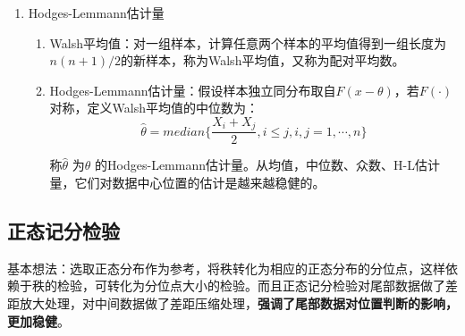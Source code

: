 \documentclass[
]{book}
\newenvironment{Shaded}{\begin{snugshade}}{\end{snugshade}}
\newcommand{\AttributeTok}[1]{\textcolor[rgb]{0.13,0.29,0.53}{#1}}
\newcommand{\CommentTok}[1]{\textcolor[rgb]{0.56,0.35,0.01}{\textit{#1}}}
\newcommand{\DecValTok}[1]{\textcolor[rgb]{0.00,0.00,0.81}{#1}}
\newcommand{\FunctionTok}[1]{\textcolor[rgb]{0.13,0.29,0.53}{\textbf{#1}}}
\newcommand{\NormalTok}[1]{#1}
\newcommand{\OtherTok}[1]{\textcolor[rgb]{0.56,0.35,0.01}{#1}}
\newcommand{\StringTok}[1]{\textcolor[rgb]{0.31,0.60,0.02}{#1}}
\begin{document}
\begin{enumerate}
  在R中，使用\texttt{wilcox.test()}函数进行Wilcoxon符号秩检验：

\begin{Shaded}
\begin{Highlighting}[]
\CommentTok{\# 单样本Wilcoxon符号秩检验}
\NormalTok{x }\OtherTok{\textless{}{-}} \FunctionTok{c}\NormalTok{(}\DecValTok{36}\NormalTok{, }\DecValTok{32}\NormalTok{, }\DecValTok{31}\NormalTok{, }\DecValTok{25}\NormalTok{, }\DecValTok{28}\NormalTok{, }\DecValTok{36}\NormalTok{, }\DecValTok{40}\NormalTok{, }\DecValTok{32}\NormalTok{, }\DecValTok{41}\NormalTok{, }\DecValTok{26}\NormalTok{, }\DecValTok{35}\NormalTok{, }\DecValTok{35}\NormalTok{, }\DecValTok{32}\NormalTok{, }\DecValTok{87}\NormalTok{, }\DecValTok{33}\NormalTok{, }\DecValTok{35}\NormalTok{)}
\FunctionTok{wilcox.test}\NormalTok{(x, }\AttributeTok{mu =} \DecValTok{37}\NormalTok{, }\AttributeTok{alternative =} \StringTok{"two.sided"}\NormalTok{)}
\end{Highlighting}
\end{Shaded}

\begin{verbatim}
## 
##  Wilcoxon signed rank test with continuity correction
## 
## data:  x
## V = 29.5, p-value = 0.04904
## alternative hypothesis: true location is not equal to 37
\end{verbatim}
\item
  Hodges-Lemmann估计量

  \begin{enumerate}
  \def\labelenumii{\arabic{enumii}.}
  \item
    Walsh平均值：对一组样本，计算任意两个样本的平均值得到一组长度为\(n(n+1)/2\)的新样本，称为Walsh平均值，又称为配对平均数。
  \item
    Hodges-Lemmann估计量：假设样本独立同分布取自\(F(x-\theta)\)，若\(F(\cdot)\)对称，定义Walsh平均值的中位数为：\[
    \hat{\theta}=median\{\frac{X_i+X_j}{2},i\leq j,i,j = 1,\cdots,n \}
    \]

    称\(\hat{\theta}\) 为\(\theta\) 的Hodges-Lemmann估计量。从均值，中位数、众数、H-L估计量，它们对数据中心位置的估计是越来越稳健的。
  \end{enumerate}
\end{enumerate}

\subsection{正态记分检验}\label{ux6b63ux6001ux8bb0ux5206ux68c0ux9a8c}

基本想法：选取正态分布作为参考，将秩转化为相应的正态分布的分位点，这样依赖于秩的检验，可转化为分位点大小的检验。而且正态记分检验对尾部数据做了差距放大处理，对中间数据做了差距压缩处理，\textbf{强调了尾部数据对位置判断的影响，更加稳健}。
\end{document}
